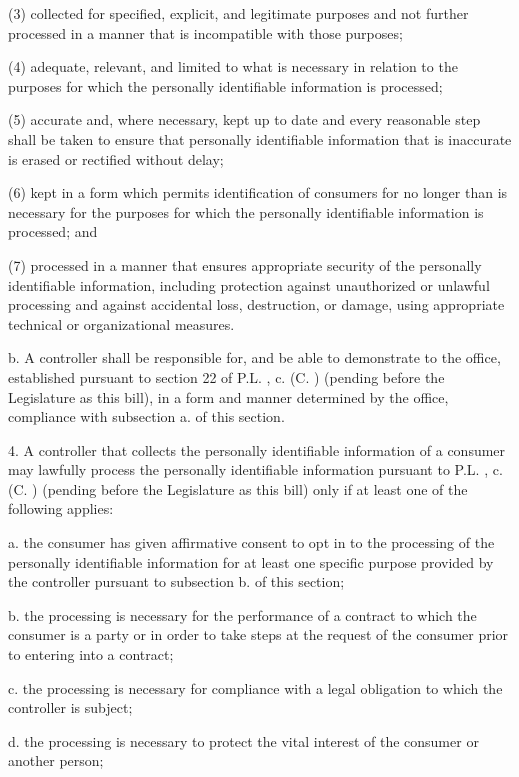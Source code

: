      (3)   collected for specified, explicit, and legitimate purposes and not further processed in a manner that is incompatible with those purposes;

     (4)   adequate, relevant, and limited to what is necessary in relation to the purposes for which the personally identifiable information is processed;

     (5)   accurate and, where necessary, kept up to date and every reasonable step shall be taken to ensure that personally identifiable information that is inaccurate is erased or rectified without delay;

     (6)   kept in a form which permits identification of consumers for no longer than is necessary for the purposes for which the personally identifiable information is processed; and

     (7)   processed in a manner that ensures appropriate security of the personally identifiable information, including protection against unauthorized or unlawful processing and against accidental loss, destruction, or damage, using appropriate technical or organizational measures.

     b.    A controller shall be responsible for, and be able to demonstrate to the office, established pursuant to section 22 of P.L.    , c.    (C.      ) (pending before the Legislature as this bill), in a form and manner determined by the office, compliance with subsection a. of this section.

 

     4.    A controller that collects the personally identifiable information of a consumer may lawfully process the personally identifiable information pursuant to P.L.    , c.    (C.      ) (pending before the Legislature as this bill) only if at least one of the following applies:

     a.     the consumer has given affirmative consent to opt in to the processing of the personally identifiable information for at least one specific purpose provided by the controller pursuant to subsection b. of this section;

     b.    the processing is necessary for the performance of a contract to which the consumer is a party or in order to take steps at the request of the consumer prior to entering into a contract;

     c.     the processing is necessary for compliance with a legal obligation to which the controller is subject;

     d.    the processing is necessary to protect the vital interest of the consumer or another person;

